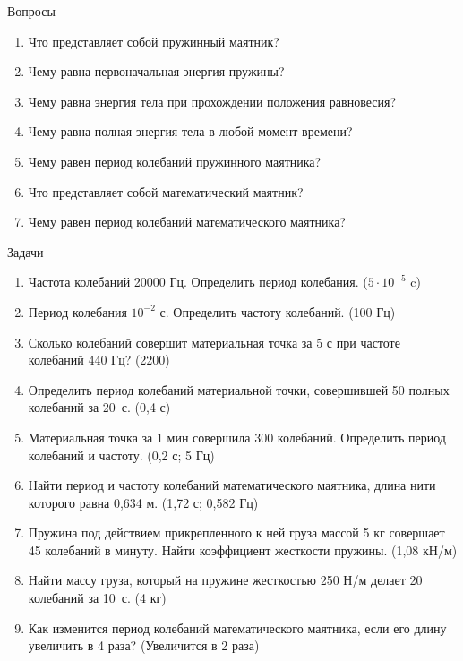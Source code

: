\documentclass[a5paper, 10pt]{diss_4}
\renewcommand{\'}{\,'}
\begin{document}
\begin{center}
   Вопросы
\end{center}
\begin{enumerate}

\item Что представляет собой пружинный маятник?
\item Чему равна первоначальная энергия пружины?
\item Чему равна энергия тела при прохождении положения равновесия?
\item Чему равна полная энергия тела в любой момент времени?
\item Чему равен период колебаний пружинного маятника?
\item Что представляет собой математический маятник?
\item Чему равен период колебаний математического маятника?

\end{enumerate}

\begin{center}
   Задачи
\end{center}
\begin{enumerate}

\item Частота колебаний 20000 Гц. Определить период колебания. ($5\cdot10^{-5}$ c)
\item Период колебания $10^{-2}$ с. Определить частоту колебаний. (100 Гц)
\item Сколько колебаний совершит материальная точка за 5 с при частоте колебаний 440 Гц? (2200)
\item Определить период колебаний материальной точки, совершившей 50 полных колебаний за 20 с. (0,4 с)
\item Материальная точка за 1 мин совершила 300 колебаний. Определить период колебаний и частоту. (0,2 с;  5 Гц)
\item Найти период и частоту колебаний математического маятника, длина нити которого равна 0,634 м. (1,72 с;  0,582 Гц)
\item Пружина под действием прикрепленного к ней груза массой 5 кг совершает 45 колебаний в минуту. Найти коэффициент жесткости пружины. (1,08 кН/м)
\item Найти массу груза, который на пружине жесткостью 250 Н/м делает 20 колебаний за 10 с. (4 кг)
\item Как изменится период колебаний математического маятника, если его длину увеличить в 4 раза? (Увеличится в 2 раза)

\end{enumerate}
\end{document}
